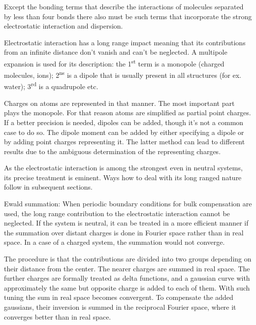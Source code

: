   Except the bonding terms that describe the interactions of molecules separated by less than four bonds there also must be such terms that incorporate the strong electrostatic interaction and dispersion. 

  Electrostatic interaction has a long range impact meaning that its contributions from an infinite distance don't vanish and can't be neglected. A multipole expansion is used for its description: the 1\textsuperscript{st} term is a monopole (charged molecules, ions); 2\textsuperscript{ns} is a dipole that is usually present in all structures (for ex. water); 3\textsuperscript{rd} is a quadrupole etc.

  Charges on atoms are represented in that manner. The most important part plays the monopole. For that reason atoms are simplified as partial point charges. If a better precision is needed, dipoles can be added, though it's not a common case to do so. The dipole moment can be added by either specifying a dipole or by adding point charges representing it. The latter method can lead to different results due to the ambiguous determination of the representing charges. 

  As the electrostatic interaction is among the strongest even in neutral systems, its precise treatment is eminent. Ways how to deal with its long ranged nature follow in subsequent sections. 



  Ewald summation: When periodic boundary conditions for bulk compensation are used, the long range contribution to the electrostatic interaction cannot be neglected. If the system is neutral, it can be treated in a more efficient manner if the summation over distant charges is done in Fourier space rather than in real space. In a case of a charged system, the summation would not converge. 

  The procedure is that the contributions are divided into two groups depending on their distance from the center. The nearer charges are summed in real space. The further charges are formally treated as delta functions, and a gaussian curve with approximately the same but opposite charge is added to each of them. With such tuning the sum in real space becomes convergent. To compensate the added gaussians, their inversion is summed in the reciprocal Fourier space, where it converges better than in real space. 



